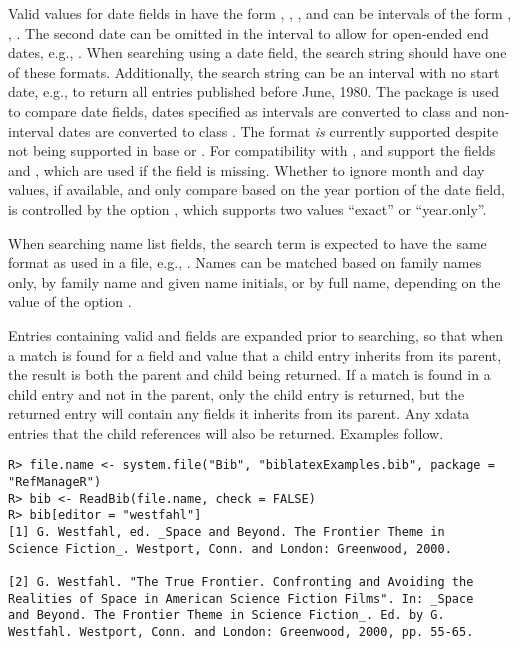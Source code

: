 \documentclass[article]{jss}\usepackage[]{graphicx}\usepackage[]{color}
\makeatletter
\newenvironment{kframe}{%
 \def\at@end@of@kframe{}%
 \ifinner\ifhmode%
  \def\at@end@of@kframe{\end{minipage}}%
  \begin{minipage}{\columnwidth}%
 \fi\fi%
 \def\FrameCommand##1{\hskip\@totalleftmargin \hskip-\fboxsep
 \colorbox{shadecolor}{##1}\hskip-\fboxsep
     \hskip-\linewidth \hskip-\@totalleftmargin \hskip\columnwidth}%
 \MakeFramed {\advance\hsize-\width
   \@totalleftmargin\z@ \linewidth\hsize
   \@setminipage}}%
 {\par\unskip\endMakeFramed%
 \at@end@of@kframe}
\newenvironment{knitrout}{}{} %
\newcommand{\ourpkg}{\pkg{RefManageR}}
\makeatother
\begin{document}
Valid values for date fields in \Biblatex{} have the form , , , and can be intervals of the form , , .  The second date can be omitted in the interval to allow for open-ended end dates, e.g., .  When searching using a date field, the search string should have one of these formats.  Additionally, the search string can be an interval with no start date, e.g.,  to return all entries published before June, 1980.  The  package \citep{lubridate} is used to compare date fields, dates specified as intervals are converted to class  and non-interval dates are converted to class .  The format  \emph{is} currently supported despite not being supported in base \R{} or .  For compatibility with \Bibtex{}, \Biblatex{} and \ourpkg{} support the fields  and , which are used if the  field is missing. Whether to ignore month and day values, if available, and only compare based on the year portion of the date field, is controlled by the option , which supports two values ``exact'' or ``year.only''.

When searching name list fields, the search term is expected to have the same format as used in a  file, e.g., .  Names can be matched based on family names only, by family name and given name initials, or by full name, depending on the value of the option .  

Entries containing valid  and  fields are expanded prior to searching, so that when a match is found for a field and value that a child entry inherits from its parent, the result is both the parent and child being returned.  If a match is found in a child entry and not in the parent, only the child entry is returned, but the returned entry will contain any fields it inherits from its parent.  Any xdata entries that the child references will also be returned.  Examples follow.

\begin{knitrout}
\color{fgcolor}\begin{kframe}
\begin{verbatim}
R> file.name <- system.file("Bib", "biblatexExamples.bib", package = "RefManageR")
R> bib <- ReadBib(file.name, check = FALSE)
R> bib[editor = "westfahl"]
[1] G. Westfahl, ed. _Space and Beyond. The Frontier Theme in
Science Fiction_. Westport, Conn. and London: Greenwood, 2000.

[2] G. Westfahl. "The True Frontier. Confronting and Avoiding the
Realities of Space in American Science Fiction Films". In: _Space
and Beyond. The Frontier Theme in Science Fiction_. Ed. by G.
Westfahl. Westport, Conn. and London: Greenwood, 2000, pp. 55-65.
\end{verbatim}
\end{kframe}
\end{knitrout}
\end{document}
